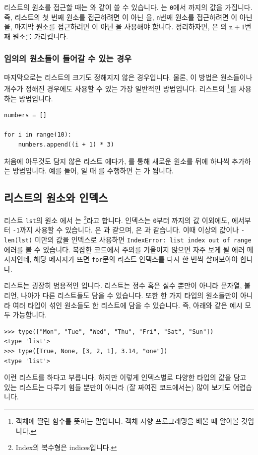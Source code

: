\documentclass[../main.tex]{subfiles}
\begin{document}
리스트의 원소를 접근할 때는 와 같이 쓸 수 있습니다.
는 \texttt{0}에서 까지의 값을 가집니다.
즉, 리스트의 첫 번째 원소를 접근하려면 이 아닌 을, \texttt{n}번째 원소를 접근하려면 이 아닌 을, 마지막 원소를 접근하려면 이 아닌 을 사용해야 합니다.
정리하자면, 은 의 $\texttt{n} + 1$번째 원소를 가리킵니다.

\subsubsection{임의의 원소들이 들어갈 수 있는 경우}
마지막으로는 리스트의 크기도 정해지지 않은 경우입니다.
물론, 이 방법은 원소들이나 개수가 정해진 경우에도 사용할 수 있는 가장 일반적인 방법입니다.
리스트의  \footnote{객체에 딸린 함수를 뜻하는 말입니다. 객체 지향 프로그래밍을 배울 때 알아볼 것입니다.}를 사용하는 방법입니다.
\begin{verbatim}
numbers = []

for i in range(10):
    numbers.append((i + 1) * 3)
\end{verbatim}
처음에 아무것도 담지 않은 리스트 \pyin{[]}에다가, 를 통해 새로운 원소를 뒤에 하나씩 추가하는 방법입니다.
예를 들어, 일 때 를 수행하면 는 \pyin{[1, 2, 3, 4]}가 됩니다.

\subsection{리스트의 원소와 인덱스}
리스트 \texttt{lst}의 원소 에서 는 \footnote{Index의 복수형은 indices입니다.}라고 합니다.
인덱스는 \texttt{0}부터 까지의 값 이외에도, 에서부터 \texttt{-1}까지 사용할 수 있습니다.
은 과 같으며, 은 과 같습니다.
이때  이상의 값이나 \texttt{-len(lst)} 미만의 값을 인덱스로 사용하면 \texttt{IndexError: list index out of range} 에러를 볼 수 있습니다.
복잡한 코드에서 주의를 기울이지 않으면 자주 보게 될 에러 메시지인데, 해당 메시지가 뜨면 \texttt{for}문의 리스트 인덱스를 다시 한 번씩 살펴보아야 합니다.

리스트는 굉장히 범용적인 입니다.
리스트는 정수 혹은 실수 뿐만이 아니라 문자열, 불리언, 나아가 다른 리스트들도 담을 수 있습니다.
또한 한 가지 타입의 원소들만이 아니라 여러 타입이 섞인 원소들도 한 리스트에 담을 수 있습니다.
즉, 아래와 같은 예시 모두 가능합니다.
\begin{verbatim}
>>> type(["Mon", "Tue", "Wed", "Thu", "Fri", "Sat", "Sun"])
<type 'list'>
>>> type([True, None, [3, 2, 1], 3.14, "one"])
<type 'list'>
\end{verbatim}
이런 리스트를 하다고 부릅니다.
하지만 이렇게 인덱스별로 다양한 타입의 값을 담고 있는 리스트는 다루기 힘들 뿐만이 아니라 (잘 짜여진 코드에서는) 많이 보기도 어렵습니다.
\end{document}
